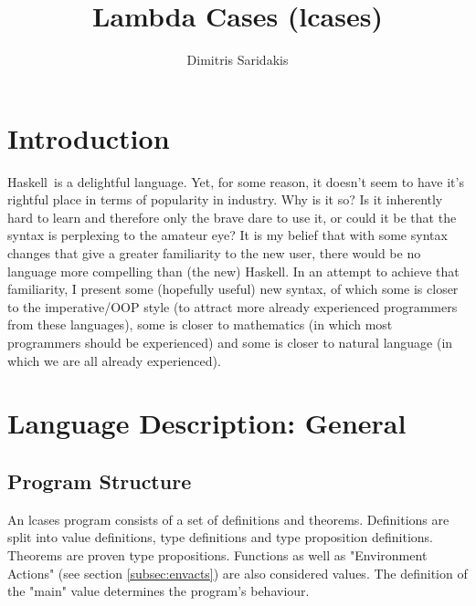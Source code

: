 \documentclass{article}
\date{}
\author{
  Dimitris Saridakis
}
\def\H{Haskell}
\begin{document}
\title{
\textbf{Lambda Cases (lcases)}
}
\maketitle

\tableofcontents

\section{Introduction}

\H\ is a delightful language. Yet, for some reason, it doesn't seem to have
it's rightful place in terms of popularity in industry. Why is it so?  Is it
inherently hard to learn and therefore only the brave dare to use it, or could
it be that the syntax is perplexing to the amateur eye? It is my belief that
with some syntax changes that give a greater familiarity to the new user, there
would be no language more compelling than (the new) \H. In an attempt to
achieve that familiarity, I present some (hopefully useful) new syntax, of
which some is closer to the imperative/OOP style (to attract more already
experienced programmers from these languages), some is closer to mathematics
(in which most programmers should be experienced) and some is closer to natural
language (in which we are all already experienced). 

\section{Language Description: General}

\subsection{Program Structure}

An lcases program consists of a set of definitions and theorems.  Definitions
are split into value definitions, type definitions and type proposition
definitions. Theorems are proven type propositions. Functions as well as
"Environment Actions" (see section \ref{subsec:envacts}) are also considered
values. The definition of the "main" value determines the program's behaviour. 
\end{document}
